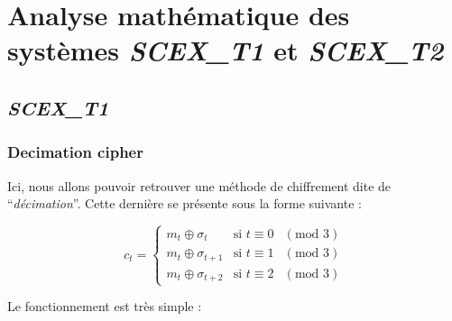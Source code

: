 \section{Analyse mathématique des systèmes \textit{SCEX\_T1} et \textit{SCEX\_T2}}
\subsection{\textit{SCEX\_T1}}
\subsubsection{Decimation cipher}
Ici, nous allons pouvoir retrouver une méthode de chiffrement dite de \enquote{\textit{décimation}}. Cette dernière se présente sous la forme suivante :
\begin{center}
    \begin{equation}
	c_t = \left\{
	    \begin{array}{lll}
		m_{t}\oplus\sigma_{t} & \mbox{si } t\equiv 0 & (\mbox{mod } 3) \\
		m_{t}\oplus\sigma_{t+1} & \mbox{si } t\equiv 1 & (\mbox{mod } 3) \\
		m_{t}\oplus\sigma_{t+2} & \mbox{si } t\equiv 2 & (\mbox{mod } 3)
	    \end{array}
	\right.
    \end{equation}
\end{center}

Le fonctionnement est très simple :


